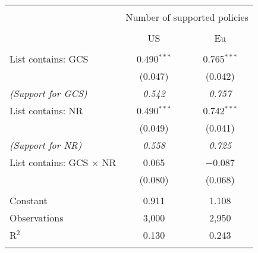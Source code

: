 
\begin{tabular}{@{\extracolsep{5pt}}lcc} 
\\[-1.8ex]\hline 
\hline \\[-1.8ex] 
 & \multicolumn{2}{c}{Number of supported policies} \\ 
\cline{2-3} 
\\[-1.8ex] & US & Eu \\ 
\hline \\[-1.8ex] 
 List contains: GCS & 0.490$^{***}$ & 0.765$^{***}$ \\ 
  & (0.047) & (0.042) \\ 
\textit{(Support for GCS)} & \textit{ 0.542 } & \textit{ 0.757 }\\
  List contains: NR & 0.490$^{***}$ & 0.742$^{***}$ \\ 
  & (0.049) & (0.041) \\ 
\textit{(Support for NR)} & \textit{ 0.558 } & \textit{ 0.725 }\\
  List contains: GCS $\times$ NR & 0.065 & $-$0.087 \\ 
  & (0.080) & (0.068) \\ 
 \hline \\[-1.8ex] 
Constant & 0.911 & 1.108 \\ 
Observations & 3,000 & 2,950 \\ 
R$^{2}$ & 0.130 & 0.243 \\ 
\hline 
\hline \\[-1.8ex] 
\end{tabular} 